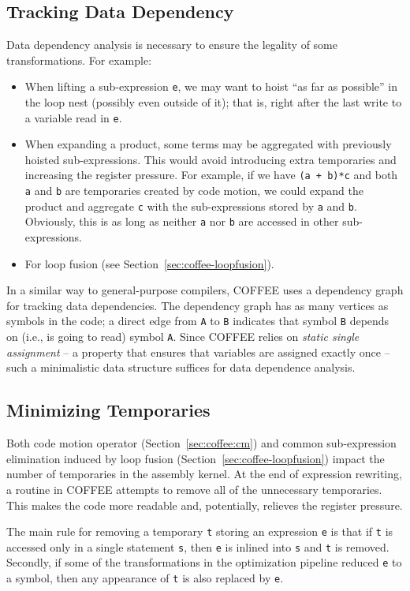 \subsection{Tracking Data Dependency}
Data dependency analysis is necessary to ensure the legality of some transformations. For example:
\begin{itemize}
\item When lifting a sub-expression \texttt{e}, we may want to hoist ``as far as possible'' in the loop nest (possibly even outside of it); that is, right after the last write to a variable read in \texttt{e}.
\item When expanding a product, some terms may be aggregated with previously hoisted sub-expressions. This would avoid introducing extra temporaries and increasing the register pressure. For example, if we have \texttt{(a + b)*c} and both \texttt{a} and \texttt{b} are temporaries created by code motion, we could expand the product and aggregate \texttt{c} with the sub-expressions stored by \texttt{a} and \texttt{b}. Obviously, this is as long as neither \texttt{a} nor \texttt{b} are accessed in other sub-expressions.
\item For loop fusion (see Section~\ref{sec:coffee-loopfusion}).
\end{itemize}

In a similar way to general-purpose compilers, COFFEE uses a dependency graph for tracking data dependencies. The dependency graph has as many vertices as symbols in the code; a direct edge from \texttt{A} to \texttt{B} indicates that symbol \texttt{B} depends on (i.e., is going to read) symbol \texttt{A}. Since COFFEE relies on \textit{static single assignment} -- a property that ensures that variables are assigned exactly once -- such a minimalistic data structure suffices for data dependence analysis.

\subsection{Minimizing Temporaries}
Both code motion operator (Section~\ref{sec:coffee:cm}) and common sub-expression elimination induced by loop fusion (Section~\ref{sec:coffee-loopfusion}) impact the number of temporaries in the assembly kernel. At the end of expression rewriting, a routine in COFFEE attempts to remove all of the unnecessary temporaries. This makes the code more readable and, potentially, relieves the register pressure.

The main rule for removing a temporary \texttt{t} storing an expression \texttt{e} is that if \texttt{t} is accessed only in a single statement \texttt{s}, then \texttt{e} is inlined into \texttt{s} and \texttt{t} is removed. Secondly, if some of the transformations in the optimization pipeline reduced \texttt{e} to a symbol, then any appearance of \texttt{t} is also replaced by \texttt{e}.